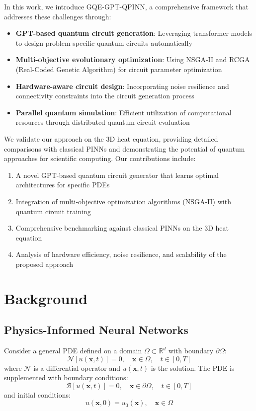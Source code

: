 \documentclass[11pt,a4paper,uplatex,dvipdfmx]{jsarticle}
\begin{document}
In this work, we introduce GQE-GPT-QPINN, a comprehensive framework that addresses these challenges through:
\begin{itemize}
    \item \textbf{GPT-based quantum circuit generation}: Leveraging transformer models to design problem-specific quantum circuits automatically
    \item \textbf{Multi-objective evolutionary optimization}: Using NSGA-II and RCGA (Real-Coded Genetic Algorithm) for circuit parameter optimization
    \item \textbf{Hardware-aware circuit design}: Incorporating noise resilience and connectivity constraints into the circuit generation process
    \item \textbf{Parallel quantum simulation}: Efficient utilization of computational resources through distributed quantum circuit evaluation
\end{itemize}

We validate our approach on the 3D heat equation, providing detailed comparisons with classical PINNs and demonstrating the potential of quantum approaches for scientific computing. Our contributions include:
\begin{enumerate}
    \item A novel GPT-based quantum circuit generator that learns optimal architectures for specific PDEs
    \item Integration of multi-objective optimization algorithms (NSGA-II) with quantum circuit training
    \item Comprehensive benchmarking against classical PINNs on the 3D heat equation
    \item Analysis of hardware efficiency, noise resilience, and scalability of the proposed approach
\end{enumerate}

\section{Background}

\subsection{Physics-Informed Neural Networks}

Consider a general PDE defined on a domain $\Omega \subset \mathbb{R}^d$ with boundary $\partial\Omega$:
\begin{equation}
    \mathcal{N}[u(\mathbf{x}, t)] = 0, \quad \mathbf{x} \in \Omega, \quad t \in [0, T]
\end{equation}
where $\mathcal{N}$ is a differential operator and $u(\mathbf{x}, t)$ is the solution. The PDE is supplemented with boundary conditions:
\begin{equation}
    \mathcal{B}[u(\mathbf{x}, t)] = 0, \quad \mathbf{x} \in \partial\Omega, \quad t \in [0, T]
\end{equation}
and initial conditions:
\begin{equation}
    u(\mathbf{x}, 0) = u_0(\mathbf{x}), \quad \mathbf{x} \in \Omega
\end{equation}
\end{document}
